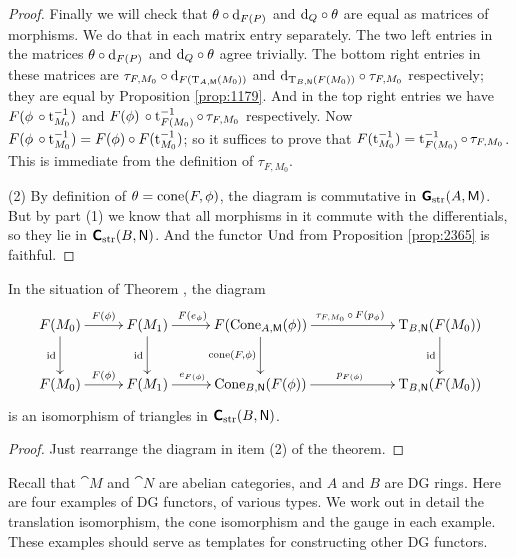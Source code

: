 \begin{proof}
Finally we will check that 
$\theta \circ \mathrm{d}_{F(P)}$ and $ \mathrm{d}_{Q} \circ \theta$ are equal as matrices of 
morphisms. We do that in each matrix entry separately. The two left 
entries in the matrices $\theta \circ \mathrm{d}_{F(P)}$ and $ \mathrm{d}_{Q} \circ \theta$
agree trivially. The bottom right entries in these matrices
are $\tau_{F, M_0} \circ \mathrm{d}_{F(\operatorname{T}_{A, \operatorname{\mathsf{M}}}(M_0))}$
and 
$\mathrm{d}_{\operatorname{T}_{B, \operatorname{\mathsf{N}}}(F(M_0))} \circ \tau_{F, M_0}$
respectively; they are equal by Proposition \ref{prop:1179}. 
And in the top right  entries we have 
$F(\phi \, \circ \operatorname{t}_{M_0}^{-1})$
and 
$F(\phi) \, \circ \operatorname{t}_{F(M_0)}^{-1} \circ \, \tau_{F, M_0}$
respectively. Now
$F(\phi \, \circ \operatorname{t}_{M_0}^{-1}) = F(\phi) \circ F(\operatorname{t}_{M_0}^{-1})$;
so it suffices to prove that 
$F(\operatorname{t}_{M_0}^{-1}) = \operatorname{t}_{F(M_0)}^{-1} \circ \, \tau_{F, M_0}$.
This is immediate from the definition of $\tau_{F, M_0}$.

\medskip \noindent 
(2) By definition of $\theta = \operatorname{cone}(F, \phi)$, the diagram is commutative in 
$\boldsymbol{\mathsf{G}}_{\mathrm{str}}(A, \operatorname{\mathsf{M}})$. But by part (1) we know that all morphisms 
in it commute with the differentials, so they lie in 
$\boldsymbol{\mathsf{C}}_{\mathrm{str}}(B, \operatorname{\mathsf{N}})$.
And the functor $\operatorname{Und}$ from Proposition \ref{prop:2365}
is faithful. 
\end{proof}

\begin{cor} \label{cor:1915}
In the situation of Theorem \tup{\ref{thm:1185}}, the diagram 
\[ \UseTips  \xymatrix @C=6.2ex @R=6ex {
F(M_0) 
\ar[r]^{F(\phi)}
\ar[d]_{\opn{id}}
& 
F(M_1) 
\ar[r]^(0.4){F(e_{\phi})}
\ar[d]_{\opn{id}}
& 
F(\opn{Cone}_{A, \cat{M}}(\phi))
\ar[rr]^{\tau_{F, M_0} \, \circ \, F(p_{\phi})}
\ar[d]_{\opn{cone}(F, \phi)}
& &
\opn{T}_{B, \cat{N}}(F(M_0))
\ar[d]_{\opn{id}}
\\
F(M_0)
\ar[r]^{F(\phi)}
& 
F(M_1)
\ar[r]^(0.4){e_{F(\phi)}}
& 
\opn{Cone}_{B, \cat{N}}(F(\phi))
\ar[rr]^{p_{F(\phi)}}
& &
\opn{T}_{B, \cat{N}}(F(M_0))
} \]
is an isomorphism of triangles in $\boldsymbol{\mathsf{C}}_{\mathrm{str}}(B, \operatorname{\mathsf{N}})$. 
\end{cor}

\begin{proof}
Just rearrange the diagram in item (2) of the theorem. 
\end{proof}




 \label{subsec:exa-DGfun}

Recall that $\cat{M}$ and $\cat{N}$ are abelian categories, and $A$ 
and $B$ are DG rings.
Here are four examples of DG functors, of various types. 
We work out in detail the translation isomorphism, the cone isomorphism and 
the gauge in each example. These examples 
should serve as templates for constructing other DG functors. 

